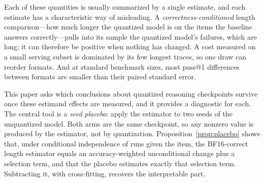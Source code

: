 \documentclass[11pt,a4paper]{article}
\begin{document}
Each of these quantities is usually summarized by a single estimate, and each estimate has a characteristic way of misleading. A \emph{correctness-conditioned} length comparison---how much longer the quantized model is on the items the baseline answers correctly---pulls into its sample the quantized model's failures, which are long; it can therefore be positive when nothing has changed. A cost measured on a small serving subset is dominated by its few longest traces, so one draw can reorder formats. And at standard benchmark sizes, most pass@1 differences between formats are smaller than their paired standard error.

This paper asks which conclusions about quantized reasoning checkpoints survive once these estimand effects are measured, and it provides a diagnostic for each. The central tool is a \emph{seed placebo}: apply the estimator to two seeds of the unquantized model. Both arms are the same checkpoint, so any nonzero value is produced by the estimator, not by quantization. Proposition~\ref{prop:placebo} shows that, under conditional independence of runs given the item, the BF16-correct length estimator equals an accuracy-weighted unconditional change plus a selection term, and that the placebo estimates exactly that selection term. Subtracting it, with cross-fitting, recovers the interpretable part.
\end{document}
